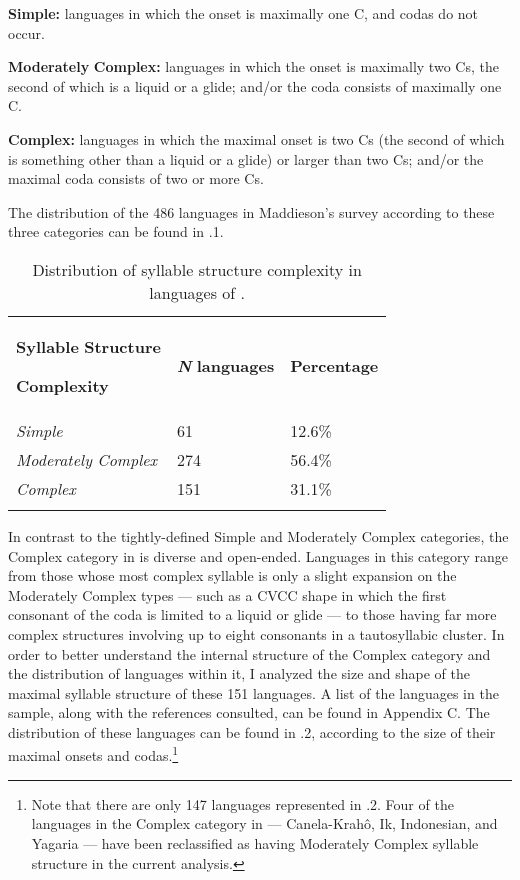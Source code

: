 \textbf{Simple:} languages in which the onset is maximally one C, and codas do not occur.

\textbf{Moderately} \textbf{Complex:} languages in which the onset is maximally two Cs, the second of which is a liquid or a glide; and/or the coda consists of maximally one C.

\textbf{Complex:} languages in which the maximal onset is two Cs (the second of which is something other than a liquid or a glide) or larger than two Cs; and/or the maximal coda consists of two or more Cs.

The distribution of the 486 languages in Maddieson's survey according to these three categories can be found in .1.

\begin{table}
\begin{tabularx}{\textwidth}{XXX}
\lsptoprule

\textbf{Syllable} \textbf{Structure} 

\textbf{Complexity} & \textbf{\textit{N}} \textbf{languages} & \textbf{Percentage}\\
\textit{Simple} & 61 & 12.6\%\\
\textit{Moderately} \textit{Complex} & 274 & 56.4\%\\
\textit{Complex} & 151 & 31.1\%\\
\lspbottomrule
\end{tabularx}
\caption{\label{tab:key:2.1.} Distribution of syllable structure complexity in languages of \citet{Maddieson2013a}.}
\end{table}

  In contrast to the tightly-defined Simple and Moderately Complex categories, the Complex category in \citet{Maddieson2013a} is diverse and open-ended. Languages in this category range from those whose most complex syllable is only a slight expansion on the Moderately Complex types — such as a CVCC shape in which the first consonant of the coda is limited to a liquid or glide — to those having far more complex structures involving up to eight consonants in a tautosyllabic cluster. In order to better understand the internal structure of the Complex category and the distribution of languages within it, I analyzed the size and shape of the maximal syllable structure of these 151 languages. A list of the languages in the sample, along with the references consulted, can be found in Appendix C. The distribution of these languages can be found in .2, according to the size of their maximal onsets and codas.\footnote{ \textrm{Note that there are only 147 languages represented in .2. Four of the languages in the Complex category in \citet{Maddieson2013a} — Canela-Krahô, Ik, Indonesian, and Yagaria — have been reclassified as having Moderately Complex syllable structure in the current analysis.}}

